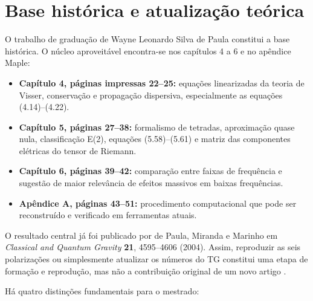 \chapter{Base histórica e atualização teórica}\label{o-que-o-tg-oferece-e-o-que-precisa-ser-atualizado}

O trabalho de graduação de Wayne Leonardo Silva de Paula
\autocite{tg2003} constitui a base histórica. O núcleo aproveitável
encontra-se nos capítulos 4 a 6 e no apêndice Maple:

\begin{itemize}
\tightlist
\item
  \textbf{Capítulo 4, páginas impressas 22--25:} equações linearizadas
  da teoria de Visser, conservação e propagação dispersiva,
  especialmente as equações (4.14)--(4.22).
\item
  \textbf{Capítulo 5, páginas 27--38:} formalismo de tetradas,
  aproximação quase nula, classificação E(2), equações (5.58)--(5.61) e
  matriz das componentes elétricas do tensor de Riemann.
\item
  \textbf{Capítulo 6, páginas 39--42:} comparação entre faixas de
  frequência e sugestão de maior relevância de efeitos massivos em
  baixas frequências.
\item
  \textbf{Apêndice A, páginas 43--51:} procedimento computacional que
  pode ser reconstruído e verificado em ferramentas atuais.
\end{itemize}

O resultado central já foi publicado por de Paula, Miranda e Marinho em
\emph{Classical and Quantum Gravity} \textbf{21}, 4595--4606 (2004).
Assim, reproduzir as seis polarizações ou simplesmente atualizar os
números do TG constitui uma etapa de formação e reprodução, mas não a
contribuição original de um novo artigo \autocite{depaula2004}.

Há quatro distinções fundamentais para o mestrado:

